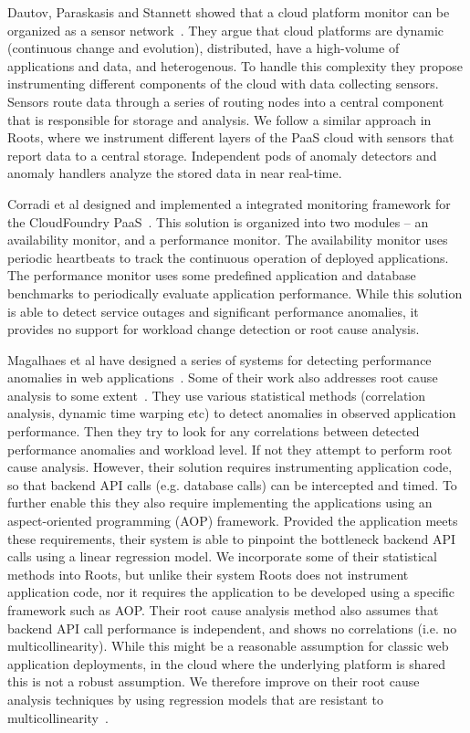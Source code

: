 Dautov, Paraskasis and Stannett showed that a cloud platform monitor
can be organized as a sensor network~\cite{Dautov2014}. 
They argue that cloud platforms are 
dynamic (continuous change and evolution), distributed, have a high-volume
of applications and data, and heterogenous. To handle this complexity
they propose instrumenting different components of the cloud with
data collecting sensors. Sensors route data through a series of routing 
nodes into a central component that is responsible for storage
and analysis. We follow a similar approach in Roots, where we
instrument different layers of the PaaS cloud with sensors that
report data to a central storage. Independent pods of anomaly
detectors and anomaly handlers analyze the stored data in near
real-time.

Corradi et al designed and implemented a integrated monitoring
framework for the CloudFoundry PaaS~\cite{6912627}. This solution is organized
into two modules -- an availability monitor, and a performance
monitor. The availability monitor uses periodic heartbeats to
track the continuous operation of deployed applications. The
performance monitor uses some predefined application and
database benchmarks to periodically evaluate application performance.
While this solution is able to detect service outages and significant
performance anomalies, it provides no support for workload change
detection or root cause analysis.

Magalhaes et al have designed a series of systems for detecting
performance anomalies in web applications~\cite{5598229}. Some of their work
also addresses root cause analysis to some extent~\cite{Magalhaes:2011:RAP:1982185.1982234}. 
They use
various statistical methods (correlation analysis, dynamic time
warping etc) to detect anomalies in observed application
performance. Then they try to look for any correlations between
detected performance anomalies and workload level. If not
they attempt to perform root cause analysis. However, their
solution requires instrumenting application code, so that
backend API calls (e.g. database calls) can be intercepted and timed. To further
enable this they also require implementing the applications 
using an aspect-oriented programming (AOP) framework. Provided
the application meets these requirements, their system is able to
pinpoint the bottleneck backend API calls using a linear regression
model. We incorporate some of their statistical methods into Roots,
but unlike their system Roots does not instrument application code, nor
it requires the application to be developed using a specific framework
such as AOP. Their root cause analysis method also assumes that
backend API call performance is independent, and shows no correlations
(i.e. no multicollinearity).
While this might be a reasonable assumption for classic web application
deployments, in the cloud where the underlying platform is shared
this is not a robust assumption. We therefore improve on their
root cause analysis techniques by using regression models that are
resistant to multicollinearity~\cite{JSSv017i01}.

